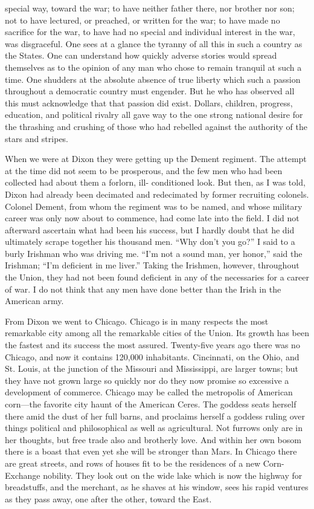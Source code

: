 special way, toward the war; to have neither father there, nor
brother nor son; not to have lectured, or preached, or written for
the war; to have made no sacrifice for the war, to have had no
special and individual interest in the war, was disgraceful.  One
sees at a glance the tyranny of all this in such a country as the
States.  One can understand how quickly adverse stories would
spread themselves as to the opinion of any man who chose to remain
tranquil at such a time.  One shudders at the absolute absence of
true liberty which such a passion throughout a democratic country
must engender.  But he who has observed all this must acknowledge
that that passion did exist.  Dollars, children, progress,
education, and political rivalry all gave way to the one strong
national desire for the thrashing and crushing of those who had
rebelled against the authority of the stars and stripes.

When we were at Dixon they were getting up the Dement regiment.
The attempt at the time did not seem to be prosperous, and the few
men who had been collected had about them a forlorn, ill-
conditioned look.  But then, as I was told, Dixon had already been
decimated and redecimated by former recruiting colonels.  Colonel
Dement, from whom the regiment was to be named, and whose military
career was only now about to commence, had come late into the
field.  I did not afterward ascertain what had been his success,
but I hardly doubt that he did ultimately scrape together his
thousand men.  ``Why don't you go?'' I said to a burly Irishman who
was driving me.  ``I'm not a sound man, yer honor,'' said the
Irishman; ``I'm deficient in me liver.''  Taking the Irishmen,
however, throughout the Union, they had not been found deficient in
any of the necessaries for a career of war.  I do not think that
any men have done better than the Irish in the American army.

From Dixon we went to Chicago.  Chicago is in many respects the
most remarkable city among all the remarkable cities of the Union.
Its growth has been the fastest and its success the most assured.
Twenty-five years ago there was no Chicago, and now it contains
120,000 inhabitants.  Cincinnati, on the Ohio, and St. Louis, at
the junction of the Missouri and Mississippi, are larger towns; but
they have not grown large so quickly nor do they now promise so
excessive a development of commerce.  Chicago may be called the
metropolis of American corn---the favorite city haunt of the
American Ceres.  The goddess seats herself there amid the dust of
her full barns, and proclaims herself a goddess ruling over things
political and philosophical as well as agricultural.  Not furrows
only are in her thoughts, but free trade also and brotherly love.
And within her own bosom there is a boast that even yet she will be
stronger than Mars.  In Chicago there are great streets, and rows
of houses fit to be the residences of a new Corn-Exchange nobility.
They look out on the wide lake which is now the highway for
breadstuffs, and the merchant, as he shaves at his window, sees his
rapid ventures as they pass away, one after the other, toward the
East.


